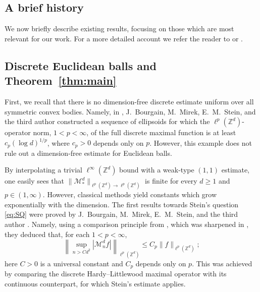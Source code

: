 \documentclass{article}
\newcommand{\Z}{\mathbb Z}
\theoremstyle{plain}
\numberwithin{equation}{section}
\begin{document}
\subsection{A brief history}

We now briefly describe existing results, focusing on those which are most relevant for our work. For a more detailed account we refer the reader to \cite[Section~1.2]{MirekSzarekWrobelGaussians} or \cite[Section~1.2]{NiksinskiWrobel}.

\subsection{Discrete Euclidean balls and Theorem~\ref{thm:main}}

First, we recall that there is no dimension-free discrete estimate uniform over all symmetric
convex bodies. Namely, in \cite[Theorem~2]{BMSWcubes}, J.~Bourgain, M.~Mirek, E.~M.~Stein, and the third author constructed a sequence
of ellipsoids for which the $\ell^p(\Z^d)$-operator norm, $1<p<\infty$, of the full discrete maximal function is
at least \(c_p(\log d)^{1/p}\), where \(c_p>0\) depends only on $p$. However, this example does
not rule out a dimension-free estimate for Euclidean balls.

By interpolating a trivial $\ell^{\infty}(\Z^d)$ bound with a weak-type $(1,1)$ estimate, one easily sees that \(\|\mathcal M_*^d\|_{\ell^p(\mathbb Z^d)\to\ell^p(\mathbb Z^d)}\) is finite for every $d\geq 1$ and $p\in(1,\infty)$. However, classical methods yield constants which grow exponentially with the dimension. The first results towards Stein's question \eqref{eq:SQ} were proved by J.~Bourgain, M.~Mirek, E.~M.~Stein, and the third author \cite{BMSWcubes,BMSWballs,BMSWperspective}. Namely, using a comparison principle from \cite[Theorem~1]{BMSWcubes}, which was sharpened in \cite[Theorem~2]{BMSWperspective}, they deduced that, for each $1<p<\infty$,
\begin{equation}
\label{eq:max ball large scale}
 \left\|\sup_{n>Cd^2}|\mathcal M_n^df|\right\|_{\ell^p(\mathbb Z^d)}\leq C_p\|f\|_{\ell^p(\mathbb Z^d)};
\end{equation}
here $C>0$ is a universal constant and $C_p$ depends only on $p$. This was achieved by comparing the discrete Hardy--Littlewood maximal operator with its continuous counterpart, for which Stein's estimate \cite[Theorem~13, p.~374]{Stein1982} applies. 
\end{document}
